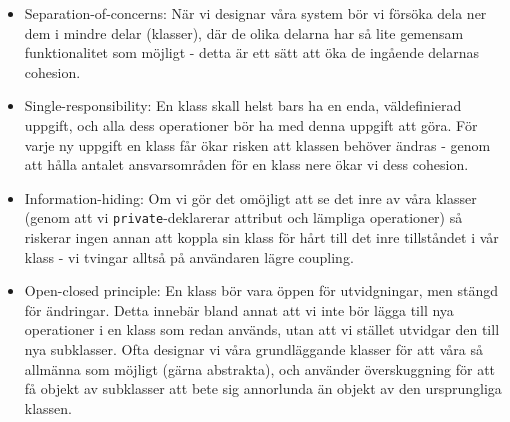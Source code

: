 \documentclass[11pt]{article}
\begin{document}
\begin{itemize}
\item{Separation-of-concerns: När vi designar våra system bör vi försöka dela ner dem i mindre delar (klasser), där de olika delarna har så lite gemensam funktionalitet som möjligt - detta är ett sätt att öka de ingående delarnas cohesion.}
\item{Single-responsibility: En klass skall helst bars ha en enda, väldefinierad uppgift, och alla dess operationer bör ha med denna uppgift att göra. För varje ny uppgift en klass får ökar risken att klassen behöver ändras - genom att hålla antalet ansvarsområden för en klass nere ökar vi dess cohesion. }
\item{Information-hiding: Om vi gör det omöjligt att se det inre av våra klasser (genom att vi \verb+private+-deklarerar attribut och lämpliga operationer) så riskerar ingen annan att koppla sin klass för hårt till det inre tillståndet i vår klass - vi tvingar alltså på användaren lägre coupling.}
\item{Open-closed principle: En klass bör vara öppen för utvidgningar, men stängd för ändringar. Detta innebär bland annat att vi inte bör lägga till nya operationer i en klass som redan används, utan att vi stället utvidgar den till nya subklasser. Ofta designar vi våra grundläggande klasser för att våra så allmänna som möjligt (gärna abstrakta), och använder överskuggning för att få objekt av subklasser att bete sig annorlunda än objekt av den ursprungliga klassen.}
\end{itemize}
\end{document}
